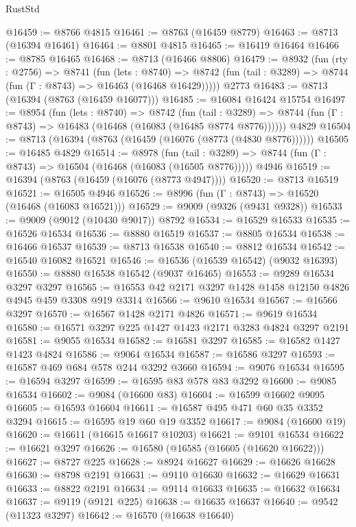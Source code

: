 \begin{lexlean}{RustStd}
\begin{coremodule}
@16459 := @8766 @4815
@16461 := @8763 (@16459 @8779)
@16463 := @8713 (@16394 @16461)
@16464 := @8801 @4815
@16465 := @16419 @16464
@16466 := @8785 @16465
@16468 := @8713 (@16466 @8806)
@16479 := @8932
    (fun (rty : @2756) =>
    @8741
      (fun (lets : @8740) =>
      @8742 (fun (tail : @3289) => @8744 (fun (Γ : @8743) => @16463 (@16468 @16429)))))
    @2773
@16483 := @8713 (@16394 (@8763 (@16459 @16077)))
@16485 := @16084 @16424 @15754
@16497 := @8954
    (fun (lets : @8740) =>
    @8742
      (fun (tail : @3289) =>
      @8744 (fun (Γ : @8743) => @16483 (@16468 (@16083 (@16485 @8774 @8776))))))
    @4829
@16504 := @8713 (@16394 (@8763 (@16459 (@16076 (@8773 (@4830 @8776))))))
@16505 := @16485 @4829
@16514 := @8978
    (fun (tail : @3289) => @8744 (fun (Γ : @8743) => @16504 (@16468 (@16083 (@16505 @8776)))))
    @4946
@16519 := @16394 (@8763 (@16459 (@16076 (@8773 @4947))))
@16520 := @8713 @16519
@16521 := @16505 @4946
@16526 := @8996 (fun (Γ : @8743) => @16520 (@16468 (@16083 @16521)))
@16529 := @9009 (@9326 (@9431 @9328))
@16533 := @9009 (@9012 (@10430 @9017)) @8792
@16534 := @16529 @16533
@16535 := @16526 @16534
@16536 := @8880 @16519
@16537 := @8805 @16534
@16538 := @16466 @16537
@16539 := @8713 @16538
@16540 := @8812 @16534
@16542 := @16540 @16082 @16521
@16546 := @16536 (@16539 @16542) (@9032 @16393)
@16550 := @8880 @16538 @16542 (@9037 @16465)
@16553 := @9289 @16534 @3297 @3297
@16565 := @16553 @42 @2171 @3297 @1428 @1458 @12150 @4826 @4945 @459 @3308 @919 @3314
@16566 := @9610 @16534
@16567 := @16566 @3297
@16570 := @16567 @1428 @2171 @4826
@16571 := @9619 @16534
@16580 := @16571 @3297 @225 @1427 @1423 @2171 @3283 @4824 @3297 @2191
@16581 := @9055 @16534
@16582 := @16581 @3297
@16585 := @16582 @1427 @1423 @4824
@16586 := @9064 @16534
@16587 := @16586 @3297
@16593 := @16587 @469 @684 @578 @244 @3292 @3660
@16594 := @9076 @16534
@16595 := @16594 @3297
@16599 := @16595 @83 @578 @83 @3292
@16600 := @9085 @16534
@16602 := @9084 (@16600 @83)
@16604 := @16599 @16602 @9095
@16605 := @16593 @16604
@16611 := @16587 @495 @471 @60 @35 @3352 @3294
@16615 := @16595 @19 @60 @19 @3352
@16617 := @9084 (@16600 @19)
@16620 := @16611 (@16615 @16617 @10203)
@16621 := @9101 @16534
@16622 := @16621 @3297
@16626 := @16580 (@16585 (@16605 (@16620 @16622)))
@16627 := @8727 @225
@16628 := @8924 @16627
@16629 := @16626 @16628
@16630 := @8798 @2191
@16631 := @9110 @16630
@16632 := @16629 @16631
@16633 := @8822 @2191
@16634 := @9114 @16633
@16635 := @16632 @16634
@16637 := @9119 (@9121 @225)
@16638 := @16635 @16637
@16640 := @9542 (@11323 @3297)
@16642 := @16570 (@16638 @16640)

\end{coremodule}
\end{lexlean}
